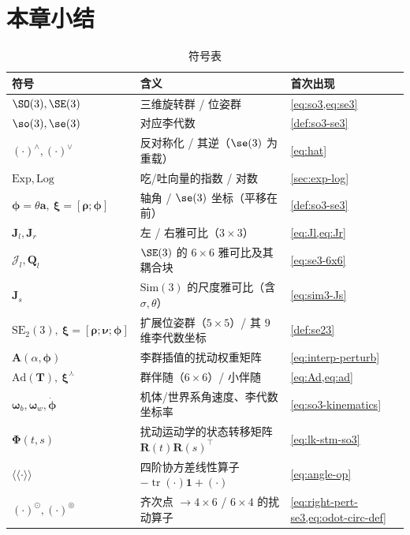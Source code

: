 \section*{本章小结}

\begin{table}[H]\centering\small
\caption{符号表}
\begin{tabular}{lll}
\toprule
符号 & 含义 & 首次出现 \\
\midrule
$\SO(3),\SE(3)$ & 三维旋转群 / 位姿群 & \cref{eq:so3,eq:se3} \\
$\so(3),\se(3)$ & 对应李代数 & \cref{def:so3-se3} \\
$(\cdot)^\wedge,(\cdot)^\vee$ & 反对称化 / 其逆（$\se(3)$ 为重载） & \cref{eq:hat} \\
$\mathrm{Exp},\mathrm{Log}$ & 吃/吐向量的指数 / 对数 & \cref{sec:exp-log} \\
$\boldsymbol{\phi}=\theta\mathbf{a},\ \boldsymbol{\xi}=[\boldsymbol{\rho};\boldsymbol{\phi}]$ & 轴角 / $\se(3)$ 坐标（平移在前） & \cref{def:so3-se3} \\
$\mathbf{J}_l,\mathbf{J}_r$ & 左 / 右雅可比（$3\times3$） & \cref{eq:Jl,eq:Jr} \\
$\boldsymbol{\mathcal{J}}_l,\mathbf{Q}_l$ & $\SE(3)$ 的 $6\times6$ 雅可比及其耦合块 & \cref{eq:se3-6x6} \\
$\mathbf{J}_s$ & $\mathrm{Sim}(3)$ 的尺度雅可比（含 $\sigma,\theta$） & \cref{eq:sim3-Js} \\
$\mathrm{SE}_2(3),\ \boldsymbol{\xi}=[\boldsymbol{\rho};\boldsymbol{\nu};\boldsymbol{\phi}]$ & 扩展位姿群（$5\times5$）/ 其 $9$ 维李代数坐标 & \cref{def:se23} \\
$\mathbf{A}(\alpha,\boldsymbol{\phi})$ & 李群插值的扰动权重矩阵 & \cref{eq:interp-perturb} \\
$\mathrm{Ad}(\mathbf{T}),\ \boldsymbol{\xi}^\curlywedge$ & 群伴随（$6\times6$）/ 小伴随 & \cref{eq:Ad,eq:ad} \\
$\boldsymbol{\omega}_b,\boldsymbol{\omega}_w,\dot{\boldsymbol{\phi}}$ & 机体/世界系角速度、李代数坐标率 & \cref{eq:so3-kinematics} \\
$\boldsymbol{\Phi}(t,s)$ & 扰动运动学的状态转移矩阵 $\mathbf{R}(t)\mathbf{R}(s)^\top$ & \cref{eq:lk-stm-so3} \\
$\langle\!\langle\cdot\rangle\!\rangle$ & 四阶协方差线性算子 $-\operatorname{tr}(\cdot)\mathbf{1}+(\cdot)$ & \cref{eq:angle-op} \\
$(\cdot)^\odot,(\cdot)^\circledcirc$ & 齐次点 $\to 4\times6$ / $6\times4$ 的扰动算子 & \cref{eq:right-pert-se3,eq:odot-circ-def} \\

\end{tabular}
\end{table}
